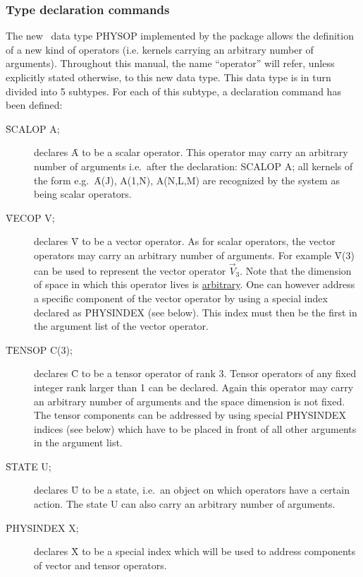 \subsubsection{Type declaration commands}

The new \REDUCE\ data type PHYSOP implemented by the package allows the
definition of a new kind of operators (i.e. kernels carrying
an arbitrary
number of arguments). Throughout this manual, the name
``operator''
will refer, unless explicitly stated otherwise, to this new data type.
This data type is in turn
divided into 5 subtypes. For each of this subtype, a declaration command
has been defined:
\begin{description}
\item[\f{SCALOP A;} ]  declares \f{A} to be a scalar
operator. This operator may
carry an arbitrary number of arguments i.e.\ after the
declaration: \f{ SCALOP A; }
all kernels of the form e.g.\
\f{A(J), A(1,N), A(N,L,M)}
are recognized by the system as being scalar operators.

\item[\f{VECOP V;} ]  declares \f{V} to be a vector operator.
As for scalar operators, the vector operators may carry an arbitrary
number of arguments. For example \f{V(3)} can be used to represent
the vector operator $\vec{V}_{3}$. Note that the dimension of space
in which this operator lives is \underline{arbitrary}.
One can however address a specific component of the
vector operator by using a special index declared as \f{PHYSINDEX} (see
below). This index must then be the first in the argument list
of the vector operator.

\item[\f{TENSOP C(3);} ]  
declares \f{C} to be a tensor operator of rank 3. Tensor operators
of any fixed integer rank larger than 1 can be declared.
Again this operator may carry an arbitrary number of arguments
and the space dimension is not fixed.
The tensor
components can be addressed by using  special \f{PHYSINDEX} indices
(see below) which have to be placed in front of all other
arguments in the argument list.


\item[\f{STATE U;} ]  declares \f{U} to be a state, i.e.\ an
object on
which operators have a certain action.  The state  U can also carry an
arbitrary number of arguments.

\item[\f{PHYSINDEX X;} ]  declares \f{X} to be a special
index which will be used
to address components of vector and tensor operators.
\end{description}

